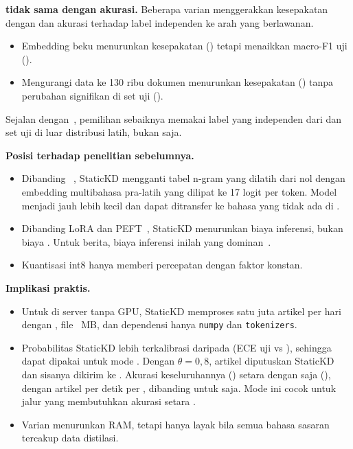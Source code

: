 \textbf{ tidak sama dengan akurasi.} Beberapa varian menggerakkan kesepakatan dengan  dan akurasi terhadap label independen ke arah yang berlawanan.
\begin{itemize}
  \item Embedding beku menurunkan kesepakatan  () tetapi menaikkan macro-F1 uji ().
  \item Mengurangi data ke 130 ribu dokumen menurunkan kesepakatan () tanpa perubahan signifikan di set uji ().
\end{itemize}
Sejalan dengan~\cite{stanton2021kd}, pemilihan  sebaiknya memakai label yang independen dari  dan set uji di luar distribusi latih, bukan  saja.

\textbf{Posisi terhadap penelitian sebelumnya.}
\begin{itemize}
  \item Dibanding ~\cite{ye2022sparse}, StaticKD mengganti tabel n-gram yang dilatih dari nol dengan embedding multibahasa pra-latih yang dilipat ke 17 logit per token. Model menjadi jauh lebih kecil dan dapat ditransfer ke bahasa yang tidak ada di .
  \item Dibanding LoRA dan PEFT~\cite{hu2022lora,razuvayevskaya2024peft}, StaticKD menurunkan biaya inferensi, bukan biaya . Untuk  berita, biaya inferensi inilah yang dominan~\cite{luccioni2024power}.
  \item Kuantisasi int8  hanya memberi percepatan dengan faktor konstan.
\end{itemize}

\textbf{Implikasi praktis.}
\begin{itemize}
  \item Untuk   di server tanpa GPU, StaticKD memproses satu juta artikel per hari dengan  , file ~MB, dan dependensi hanya \texttt{numpy} dan \texttt{tokenizers}.
  \item Probabilitas StaticKD lebih terkalibrasi daripada  (ECE uji  vs ), sehingga dapat dipakai untuk mode . Dengan $\theta=0{,}8$,  artikel diputuskan StaticKD dan sisanya dikirim ke . Akurasi keseluruhannya () setara dengan  saja (), dengan   artikel per detik per , dibanding  untuk  saja. Mode ini cocok untuk jalur  yang membutuhkan akurasi setara .
  \item Varian  menurunkan RAM, tetapi hanya layak bila semua bahasa sasaran tercakup data distilasi.
\end{itemize}
